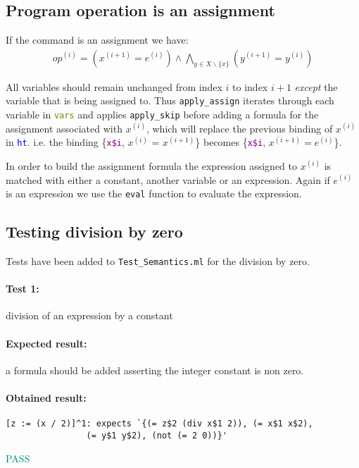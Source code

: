 \documentclass[letterpaper,12pt]{article}
\begin{document}
\subsection{Program operation is an assignment}\label{assign}

If the command is an assignment we have:
\begin{align*}
op^{(i)} = (x^{(i+1)} = e^{(i)}) \wedge \bigwedge_{y \in X\backslash \{x\} }(y^{(i+1)} = y^{(i)})
\end{align*}

All variables should remain unchanged from index $i$ to index $i+1$ \textit{except} the variable that is being assigned to. Thus \texttt{apply\_assign} iterates through each variable in \texttt{\textcolor{olive}{vars}} and applies \texttt{apply\_skip} before adding a formula for the assignment associated with $x^{(i)}$, which will replace the previous binding of $x^{(i)}$ in \texttt{\textcolor{blue}{ht}}.
i.e. the binding \{\texttt{\textcolor{purple}{x\$i}}, $x^{(i)}$ = $x^{(i+1)}$\} becomes \{\texttt{\textcolor{purple}{x\$i}}, $x^{(i+1)} = e^{(i)}$\}.

In order to build the assignment formula the expression assigned to $x^{(i)}$ is matched with either a constant, another variable or an expression. Again if $e^{(i)}$ is an expression we use the \texttt{eval} function to evaluate the expression.

\subsection{Testing division by zero} 
Tests have been added to \texttt{Test\_Semantics.ml} for the division by zero.

\paragraph{Test 1:}division of an expression by a constant
\paragraph{Expected result:}a formula should be added asserting the integer constant is non zero.
\paragraph{Obtained result:}
\begin{verbatim}
[z := (x / 2)]^1: expects `{(= z$2 (div x$1 2)), (= x$1 x$2),
				(= y$1 y$2), (not (= 2 0))}'
\end{verbatim}
\textcolor{teal}{PASS}
\end{document}
